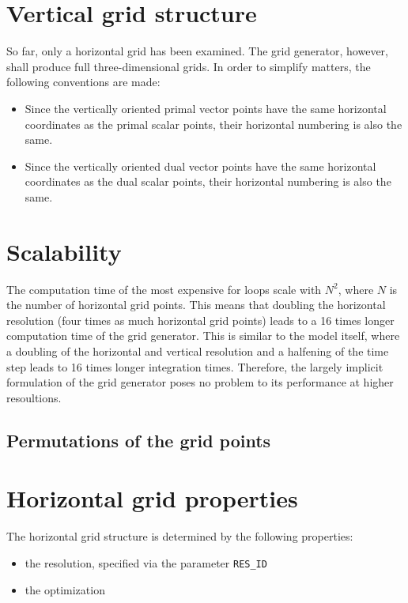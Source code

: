 \documentclass[10pt]{report}
\begin{document}
\section{Vertical grid structure}
\label{sec:vertical_grid_structure}

So far, only a horizontal grid has been examined. The grid generator, however, shall produce full three-dimensional grids. In order to simplify matters, the following conventions are made:
%
\begin{itemize}
\item Since the vertically oriented primal vector points have the same horizontal coordinates as the primal scalar points, their horizontal numbering is also the same.
\item Since the vertically oriented dual vector points have the same horizontal coordinates as the dual scalar points, their horizontal numbering is also the same.
\end{itemize}

\section{Scalability}
\label{sec:scalability}

The computation time of the most expensive for loops scale with $N^2$, where $N$ is the number of horizontal grid points. This means that doubling the horizontal resolution (four times as much horizontal grid points) leads to a 16 times longer computation time of the grid generator. This is similar to the model itself, where a doubling of the horizontal and vertical resolution and a halfening of the time step leads to 16 times longer integration times. Therefore, the largely implicit formulation of the grid generator poses no problem to its performance at higher resoultions.

\subsection{Permutations of the grid points}
\label{sec:permutations_of_the_grid_points}

\section{Horizontal grid properties}
\label{sec:horizontal_grid_properties}

The horizontal grid structure is determined by the following properties:

\begin{itemize}
\item the resolution, specified via the parameter \texttt{RES\_ID}
\item the optimization
\end{itemize}
\end{document}

